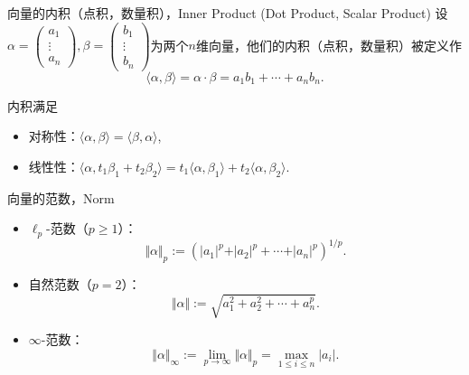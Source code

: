 \begin{frame}

\begin{block}{向量的内积（点积，数量积），Inner Product (Dot Product, Scalar Product)}
设\(\displaystyle \alpha = \begin{pmatrix} a_1 \\ \vdots \\ a_n \end{pmatrix}, \beta = \begin{pmatrix} b_1 \\ \vdots \\ b_n \end{pmatrix}\)为两个$n$维向量，他们的内积（点积，数量积）被定义作
\[\langle \alpha, \beta \rangle = \alpha\cdot\beta = a_1b_1 + \cdots + a_nb_n.\]

\pause

内积满足
\begin{itemize}
\item 对称性：$\langle \alpha, \beta \rangle = \langle \beta, \alpha \rangle$,
\item 线性性：$\langle \alpha, t_1\beta_1 + t_2\beta_2 \rangle = t_1\langle \alpha, \beta_1 \rangle +  t_2\langle \alpha, \beta_2 \rangle$.
\end{itemize}
\end{block}

\end{frame}


\begin{frame}

\begin{block}{向量的范数，Norm}
\begin{itemize}
\item<1-> $\ell_p$-范数（$p\geqslant 1$）：
\[\Vert \alpha \Vert_p := \left( \vert a_1 \vert^p + \vert a_2 \vert^p + \cdots + \vert a_n \vert^p \right)^{1/p}.\]
\item<2-> 自然范数（$p = 2$）：
\[\Vert \alpha \Vert := \sqrt{a_1^2 + a_2^2 + \cdots + a_n^p}.\]
\item<3-> $\infty$-范数：
\[\Vert \alpha \Vert_{\infty} := \lim\limits_{p\to\infty} \Vert \alpha \Vert_p = \max_{1\leqslant i \leqslant n} \vert a_i \vert.\]
\end{itemize}
\end{block}

\end{frame}


